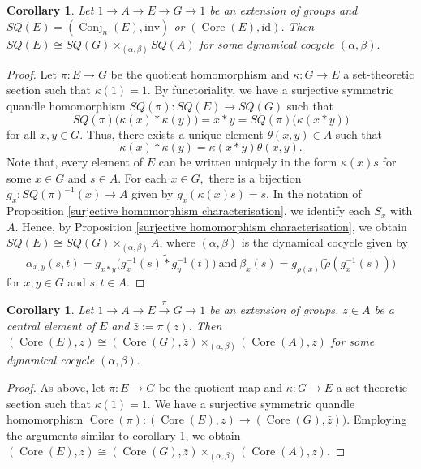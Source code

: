 \documentclass[11pt,reqno]{amsart}
\newtheorem{corollary}[theorem]{Corollary}
\theoremstyle{definition}
\numberwithin{equation}{subsection}
\newcommand{\Conj}{\operatorname{Conj}}
\newcommand{\Core}{\operatorname{Core}}
\newcommand{\id}{\mathrm{id}}
\begin{document}
\begin{corollary}\label{conj core extension}
Let $1 \rightarrow A \rightarrow E \rightarrow G \rightarrow 1$ be an extension of groups and $SQ(E)=(\Conj_n(E),\mathrm{inv})$ or $(\Core(E), \id)$. Then $SQ(E) \cong SQ(G) \times_{(\alpha,\beta)} SQ(A)$ for some dynamical cocycle $(\alpha, \beta).$	
\end{corollary}
\begin{proof}
	Let $\pi:E \rightarrow G$ be the quotient homomorphism and $\kappa:G \rightarrow E$ a set-theoretic section such that $\kappa(1)=1$. By functoriality, we have a surjective symmetric quandle homomorphism $SQ(\pi):SQ(E) \rightarrow SQ(G)$ such that 
	$$SQ(\pi)\big(\kappa(x)*\kappa(y)\big)=x*y=SQ(\pi)\big(\kappa(x*y)\big)$$
	for all $x,y \in G$. Thus, there exists a unique element $\theta(x,y) \in A$ such that 
	$$\kappa(x)*\kappa(y)=\kappa(x*y)\theta(x,y).$$
Note that, every element of $E$ can be written uniquely in the form $\kappa(x)s$ for some $x \in G$ and $s \in A$. For each $x \in G,$ there is a bijection $g_x:SQ(\pi)^{-1}(x) \rightarrow A$ given by $g_x(\kappa(x)s)=s.$ In the notation of Proposition \ref{surjective homomorphism characterisation}, we identify each $S_x$ with $A$. Hence, by Proposition \ref{surjective homomorphism characterisation}, we obtain $SQ(E) \cong SQ(G) \times_{(\alpha,\beta)} A$, where $(\alpha,\beta)$ is the dynamical cocycle given by 
$$\alpha_{x,y}(s,t)= g_{x*y} \big(g_x^{-1}(s)\tilde{*}g_y^{-1}(t)\big)~\textrm{and}~ \beta_x(s)=g_{\rho(x)} \big(\tilde{\rho}(g_x^{-1}(s))\big)$$ for $x,y\in G$ and $s,t \in A$.
\end{proof}

\begin{corollary}\label{core extension}
	Let $1 \rightarrow A \rightarrow E \xrightarrow{\pi} G \rightarrow 1$ be an extension of groups, $z \in A$ be a central element of $E$ and $\bar{z}:=\pi(z)$. Then $(\Core(E), z) \cong (\Core(G), \bar{z}) \times_{(\alpha,\beta)} (\Core(A), z)$ for some dynamical cocycle $(\alpha, \beta).$	
\end{corollary}

\begin{proof}
As above, let $\pi:E \rightarrow G$ be the quotient map and $\kappa:G \rightarrow E$ a set-theoretic section such that $\kappa(1)=1$. We have a surjective symmetric quandle homomorphism $\Core(\pi):(\Core(E), z) \rightarrow (\Core(G), \bar{z}))$. Employing the arguments similar to corollary \ref{conj core extension}, we obtain $(\Core(E), z) \cong (\Core(G), \bar{z}) \times_{(\alpha,\beta)} (\Core(A), z)$.
\end{proof}
\medskip
\end{document}
